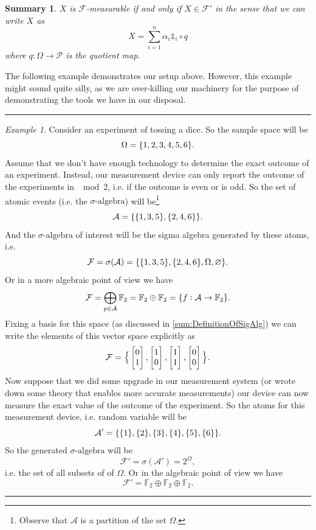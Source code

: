 \documentclass[11pt,a4paper]{article}
\newtheorem{summary}{Summary}
\theoremstyle{definition}
\theoremstyle{remark}
\newtheorem{example}{Example}
\begin{document}
	
	\begin{summary}
		\label{sum:DualBasisFuncitons}
		$ X $ is $ \mathcal{F} $-measurable if and only if $ X \in \mathcal{F}' $ in the sense that we can write $ X $ as
		\[ X = \sum_{i=1}^n \alpha_i \mathds{1}_{i}\circ q \]
		where $ q: \Omega\to \mathcal{P} $ is the quotient map.
	\end{summary}
	
	The following example demonstrates our setup above. However, this example might sound quite silly, as we are over-killing our machinery for the purpose of demonstrating the tools we have in our disposal.
	
	\vspace{5pt}
	\hrule
	\begin{example}
		Consider an experiment of tossing a dice. So the sample space will be
		\[ \Omega = \{1,2,3,4,5,6\}. \]
		Assume that we don't have enough technology to determine the exact outcome of an experiment. Instead, our measurement device can only report the outcome of the experiments in $ \mod{2} $, i.e. if the outcome is even or is odd. So the set of atomic events (i.e. the $\sigma\text{-algebra}$) will be\footnote{Observe that $ \mathcal{A} $ is a partition of the set $ \Omega $.}
		\[ \mathcal{A} = \{\{1,3,5\},\{2,4,6\}\}. \]
		And the $\sigma\text{-algebra}$ of interest will be the sigma algebra generated by these atoms, i.e.
		\[ \mathcal{F} = \sigma(\mathcal{A}) = \{\{1,3,5\},\{2,4,6\},\Omega,\varnothing\}.\]
		Or in a more algebraic point of view we have
		\[ \mathcal{F}  = \bigoplus_{p\in \mathcal{A}}\mathbb{F}_2 = \mathbb{F}_2 \oplus \mathbb{F}_2 = \{f:\mathcal{A}\to \mathbb{F}_2\}. \]
		Fixing a basis for this space (as discussed in \autoref{sum:DefinitionOfSigAlg}) we can write the elements of this vector space explicitly as
		\[ \mathcal{F} = \big\{ \begin{bmatrix} 0 \\ 1 \end{bmatrix},\begin{bmatrix} 1 \\ 0 \end{bmatrix},\begin{bmatrix} 1 \\ 1 \end{bmatrix},\begin{bmatrix} 0 \\ 0 \end{bmatrix} \big\}. \]
		Now suppose that we did some upgrade in our measurement system (or wrote down some theory that enables more accurate measurements) our device can now measure the exact value of the outcome of the experiment. So the atoms for this measurement device, i.e. random variable will be
		\[ \mathcal{A}' = \{\{1\},\{2\},\{3\},\{4\},\{5\},\{6\}\}. \]
		So the generated $\sigma\text{-algebra}$ will be
		\[ \mathcal{F}' = \sigma(\mathcal{A}') = 2^\Omega, \]
		i.e. the set of all subsets of of $ \Omega $. Or in the algebraic point of view we have
		\[ \mathcal{F}' = \mathbb{F}_2 \oplus \mathbb{F}_2 \oplus \mathbb{F}_2. \]
	\end{example}
	\hrule
	
\end{document}

